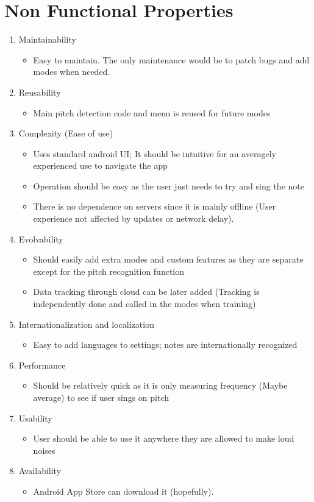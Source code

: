 \documentclass{article}
\begin{document}
\section{Non Functional Properties}
\begin{enumerate}
  \item Maintainability
    \begin{itemize}
      \item Easy to maintain. The only maintenance would be to patch bugs and add modes when needed.
    \end{itemize}
  \item Reusability 
    \begin{itemize}
      \item Main pitch detection code and menu is reused for future modes
    \end{itemize}
  \item Complexity (Ease of use)
    \begin{itemize}
      \item Uses standard android UI; It should be intuitive for an averagely experienced use to navigate the app
      \item Operation should be easy as the user just needs to try and sing the note
      \item There is no dependence on servers since it is mainly offline (User experience not affected by updates or network delay).
    \end{itemize} 
  \item Evolvability
    \begin{itemize}
      \item Should easily add extra modes and custom features as they are separate except for the pitch recognition function
      \item Data tracking through cloud can be later added (Tracking is independently done and called in the modes when training)
    \end{itemize}
  \item Internationalization and localization
    \begin{itemize}
      \item Easy to add languages to settings; notes are internationally recognized
    \end{itemize}
  \item Performance 
    \begin{itemize}
      \item Should be relatively quick as it is only measuring frequency (Maybe average) to see if user sings on pitch
    \end{itemize}
  \item Usability
    \begin{itemize}
      \item User should be able to use it anywhere they are allowed to make loud noises
    \end{itemize}
  \item Availability
    \begin{itemize}
      \item Android App Store can download it (hopefully).
    \end{itemize}
\end{enumerate}
\end{document}
